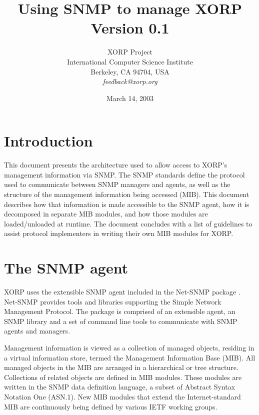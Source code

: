 \documentclass[11pt]{article}
\begin{document}
\title{Using SNMP to manage XORP \\
\vspace{1ex}
Version 0.1}
\author{ XORP Project					\\
	 International Computer Science Institute	\\
	 Berkeley, CA 94704, USA			\\
	 {\it feedback@xorp.org}
}
\date{March 14, 2003}

\maketitle

\thispagestyle{empty}


\section{Introduction}

This document presents the architecture used to allow access to XORP's 
management information via SNMP.  The SNMP standards define the protocol
used to communicate between SNMP managers and agents, as well as the structure
of the management information being accessed (MIB).  This document describes how that
information is made accessible to the SNMP agent, how it is decomposed in 
separate MIB modules, and how those modules are loaded/unloaded at runtime.
The document concludes with a list of guidelines to assist protocol implementers
in writing their own MIB modules for XORP.

\section{The SNMP agent}

XORP uses the extensible SNMP agent included in the Net-SNMP package \cite{net-snmp}.  
Net-SNMP provides tools and libraries supporting the Simple Network Management
Protocol.  The package is comprised of an extensible agent, an SNMP library and a
set of command line tools to communicate with SNMP agents and managers. 

Management information is viewed as a collection of managed objects, residing in
a virtual information store, termed the Management Information Base (MIB).  All
managed objects in the MIB are arranged in a hierarchical or tree structure.
Collections of related objects are defined in MIB modules.  These modules are
written in the SNMP data definition language, a subset of Abstract Syntax
Notation One (ASN.1).  New MIB modules that extend the Internet-standard MIB are
continuously being defined by various IETF working groups.  
\end{document}
